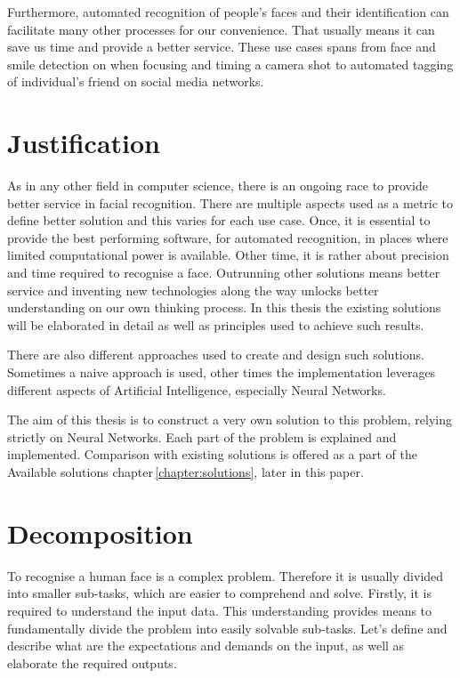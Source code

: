 Furthermore, automated recognition of people's faces and their identification can facilitate many other processes for our convenience. That usually means it can save us time and provide a better service. These use cases spans from face and smile detection on when focusing and timing a camera shot to automated tagging of individual's friend on social media networks.

\section{Justification}

As in any other field in computer science, there is an ongoing race to provide better service in facial recognition. There are multiple aspects used as a metric to define better solution and this varies for each use case. Once, it is essential to provide the best performing software, for automated recognition, in places where limited computational power is available. Other time, it is rather about precision and time required to recognise a face. Outrunning other solutions means better service and inventing new technologies along the way unlocks better understanding on our own thinking process. In this thesis the existing solutions will be elaborated in detail as well as principles used to achieve such results.

There are also different approaches used to create and design such solutions. Sometimes a naive approach is used, other times the implementation leverages different aspects of Artificial Intelligence, especially Neural Networks.

The aim of this thesis is to construct a very own solution to this problem, relying strictly on Neural Networks. Each part of the problem is explained and implemented. Comparison with existing solutions is offered as a part of the Available solutions chapter\,\ref{chapter:solutions}, later in this paper.


\section{Decomposition}

To recognise a human face is a complex problem. Therefore it is usually divided into smaller sub-tasks, which are easier to comprehend and solve. Firstly, it is required to understand the input data. This understanding provides means to fundamentally divide the problem into easily solvable sub-tasks. Let's define and describe what are the expectations and demands on the input, as well as elaborate the required outputs.

